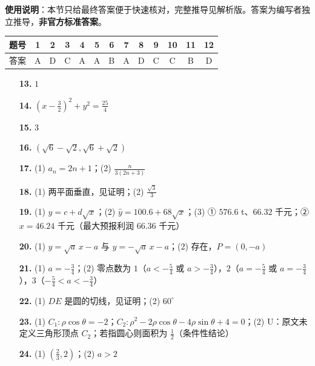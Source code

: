 
\begin{gknotice}
\textbf{使用说明}：本节只给最终答案便于快速核对，完整推导见解析版。答案为编写者独立推导，\textbf{非官方标准答案}。
\end{gknotice}

\begin{center}\begin{tabular}{ccccccccccccc}
\toprule
题号 & 1 & 2 & 3 & 4 & 5 & 6 & 7 & 8 & 9 & 10 & 11 & 12 \\
\midrule
答案 & A & D & C & A & A & B & A & D & C & C & B & D \\
\bottomrule
\end{tabular}\end{center}

\begin{itemize}[leftmargin=2.6em]
  \item[\textbf{13.}] $1$
  \item[\textbf{14.}] $(x-\frac32)^2+y^2=\frac{25}{4}$
  \item[\textbf{15.}] $3$
  \item[\textbf{16.}] $(\sqrt6-\sqrt2,\sqrt6+\sqrt2)$
\end{itemize}

\begin{itemize}[leftmargin=2.6em]
  \item[\textbf{17.}] (1) $a_n=2n+1$；(2) $\frac{n}{3(2n+3)}$
  \item[\textbf{18.}] (1) 两平面垂直，见证明；(2) $\frac{\sqrt3}{3}$
  \item[\textbf{19.}] (1) $y=c+d\sqrt x$；(2) $\widehat y=100.6+68\sqrt x$；(3) ① $576.6$ t、$66.32$ 千元；② $x=46.24$ 千元（最大预报利润 $66.36$ 千元）
  \item[\textbf{20.}] (1) $y=\sqrt a\,x-a$ 与 $y=-\sqrt a\,x-a$；(2) 存在，$P=(0,-a)$
  \item[\textbf{21.}] (1) $a=-\frac34$；(2) 零点数为 $1$（$a<-\frac54$ 或 $a>-\frac34$），$2$（$a=-\frac54$ 或 $a=-\frac34$），$3$（$-\frac54<a<-\frac34$）
  \item[\textbf{22.}] (1) $DE$ 是圆的切线，见证明；(2) $60^\circ$
  \item[\textbf{23.}] (1) $C_1:\rho\cos\theta=-2$；$C_2:\rho^2-2\rho\cos\theta-4\rho\sin\theta+4=0$；(2) U：原文未定义三角形顶点 $C_2$；若指圆心则面积为 $\frac12$（条件性结论）
  \item[\textbf{24.}] (1) $(\frac23,2)$；(2) $a>2$
\end{itemize}
